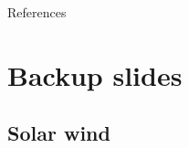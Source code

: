\begin{frame}[t,allowframebreaks]{References}
	\tiny
	\begin{thebibliography}{10}
	
		\beamertemplatebookbibitems
		
		\beamertemplatearticlebibitems
		
		

	\end{thebibliography}
\end{frame}


\appendix


\section{Backup slides}

\subsection{Solar wind}

